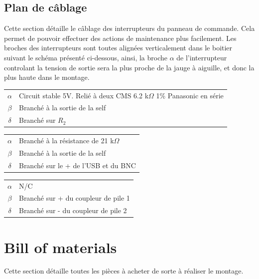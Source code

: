 \documentclass[12pt]{article}
\begin{document}
\subsection{Plan de câblage}

Cette section détaille le câblage des interrupteurs du panneau de commande. Cela permet de pouvoir effectuer des actions de 
maintenance plus facilement. Les broches des interrupteurs sont toutes alignées verticalement dans le boitier suivant le
schéma présenté ci-dessous, ainsi, la broche $\alpha$ de l'interrupteur controlant la tension de sortie sera la plus proche
de la jauge à aiguille, et donc la plus \og haute \fg dans le montage.\newline

\begin{tabular}{|c|l|}
	\hline
	$\alpha$ 	& Circuit stable 5V. Relié à deux CMS 6.2 k$\Omega$ 1\% Panasonic en série	\\ \cline{1-1}
	$\beta$ 	& Branché à la sortie de la self						\\ \cline{1-1}
	$\delta$ 	& Branché sur $R_2$								\\ \cline{1-1}
	\hline
\end{tabular}\newline


\begin{tabular}{|c|l|}
	\hline
	$\alpha$ 	& Branché à la résistance de 21 k$\Omega$					\\ \cline{1-1}
	$\beta$ 	& Branché à la sortie de la self						\\ \cline{1-1}
	$\delta$ 	& Branché sur le + de l'USB et du BNC			 			\\ \cline{1-1}
	\hline
\end{tabular}\newline

\begin{tabular}{|c|l|}
	\hline
	$\alpha$ 	& N/C										\\ \cline{1-1}
	$\beta$ 	& Branché sur + du coupleur de pile 1						\\ \cline{1-1}
	$\delta$ 	& Branché sur - du coupleur de pile 2						\\ \cline{1-1}
	\hline
\end{tabular}\newline





\newpage
\section{Bill of materials}
Cette section détaille toutes les pièces à acheter de sorte à réaliser le montage.
\end{document}

